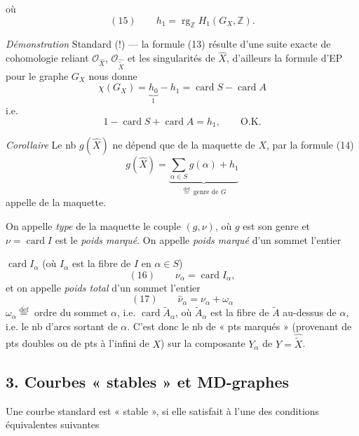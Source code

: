 \documentclass[11pt,a4paper]{article}
\begin{document}
où \struck{\ill{}}
\[
(15)\qquad h_{1} = \operatorname{rg}_{\mathbb{Z}} H_{1}(G_{X}, \mathbb{Z}) .
\]

\emph{Démonstration} Standard (!) — la formule (13) résulte d'une suite exacte  de cohomologie reliant $\mathcal{O}_{\widehat{X}}$, $\mathcal{O}_{\widehat{\widetilde{X}}}$ et les singularités de $\widehat{X}$, d'ailleurs la formule d'EP pour le graphe $G_{X}$ nous donne
\[
\chi(G_{X}) = \underbrace{h_{0}}_{1} - h_{1} = \operatorname{card} S - \operatorname{card} A
\]
i.e.
\[
1 - \operatorname{card} S + \operatorname{card} A = h_{1}, \qquad \text{O.K.}
\]

\emph{Corollaire} Le nb $g(\widehat{X})$ ne dépend que de la maquette de $X$, par la formule (14)
\[
g(\widehat{X}) = \underbrace{\sum_{\alpha \in S} g(\alpha) + h_{1}}_{\overset{\mathrm{d\acute ef}}{=}\ \text{genre de } G}
\]
\ill{} appelle   de la maquette.

On appelle \emph{type} de la maquette le couple $(g, \nu)$, où $g$ est son genre et $\nu = \operatorname{card} I$ est le \emph{poids marqué}. On appelle \emph{poids marqué} d'un sommet l'entier


\marginal{\ill{} \ill{} \ill{}}
\ill{} $\operatorname{card} I_{\alpha}$ (où $I_{\alpha}$ est la fibre de $I$ en $\alpha \in S$)
\[
(16)\qquad \nu_{\alpha} = \operatorname{card} I_{\alpha} ,
\]
et on appelle \emph{poids total} d'un sommet l'entier
\[
(17)\qquad \widehat{\nu}_{\alpha} = \nu_{\alpha} + \omega_{\alpha}
\]
$\omega_{\alpha} \overset{\mathrm{d\acute ef}}{=}$ ordre du sommet $\alpha$, i.e. $\operatorname{card} \widetilde{A}_{\alpha}$, où $\widetilde{A}_{\alpha}$ est la fibre de $\widetilde{A}$ au-dessus de $\alpha$, i.e. le nb d'arcs sortant de $\alpha$. C'est donc le nb de « pts marqués » (provenant de pts doubles ou de pts à l'infini de $X$) sur la composante $Y_{\alpha}$ de $Y = \widehat{\widetilde{X}}$.

\subsection{3. Courbes « stables » et MD-graphes}

Une courbe standard  est « stable », si elle satisfait à l'une des conditions équivalentes suivantes
\end{document}
